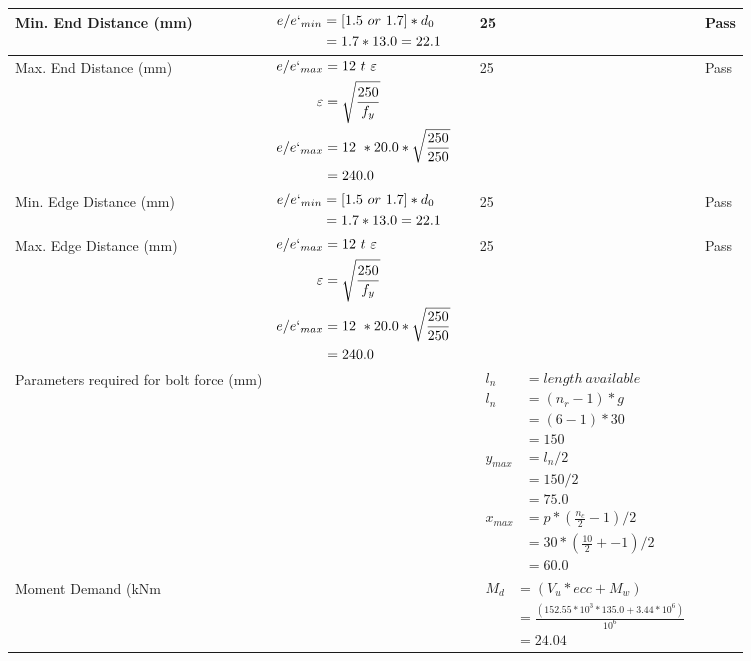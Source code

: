 \documentclass{article}%
\begin{document}
\begin{longtable}{|p{4cm}|p{5cm}|p{5.5cm}|p{1.5cm}|}
\hline%
Min. End Distance (mm)&$\begin{aligned}e/e`_{min} &=[1.5~or~ 1.7] * d_0\\ &=1.7*13.0=22.1 \end{aligned}$&25&Pass\\%
\hline%
Max. End Distance (mm)&$\begin{aligned}e/e`_{max} &= 12~ t~ \varepsilon&\\ \varepsilon &= \sqrt{\frac{250}{f_y}}\\ e/e`_{max}&=12 ~*20.0*\sqrt{\frac{250}{250}}\\ &=240.0\\ \end{aligned}$&25&Pass\\%
\hline%
Min. Edge Distance (mm)&$\begin{aligned}e/e`_{min} &=[1.5~or~ 1.7] * d_0\\ &=1.7*13.0=22.1 \end{aligned}$&25&Pass\\%
\hline%
Max. Edge Distance (mm)&$\begin{aligned}e/e`_{max} &= 12~ t~ \varepsilon&\\ \varepsilon &= \sqrt{\frac{250}{f_y}}\\ e/e`_{max}&=12 ~*20.0*\sqrt{\frac{250}{250}}\\ &=240.0\\ \end{aligned}$&25&Pass\\%
\hline%
Parameters required for bolt force (mm)&&$\begin{aligned} l_n~~~ &= length~available \\  l_n~~~ &= (n_r - 1) * g\\  &= (6 - 1) *30\\  & =150\\  y_{max} &= l_n / 2\\  &= 150 / 2 \\  & =75.0\\ x_{max} &= p * (\frac{n_c}{2} - 1) / 2 \\  &= 30 * (\frac{10}{2} + - 1) / 2 \\  & =60.0\end{aligned}$&\\%
\hline%
Moment Demand (kNm&&$\begin{aligned}  M_d &= (V_u * ecc + M_w)\\  &= \frac{(152.55 * 10^3 *135.0 + 3.44*10^6)}{10^6}\\  & =24.04\end{aligned}$&\\%

\end{longtable}
\end{document}
